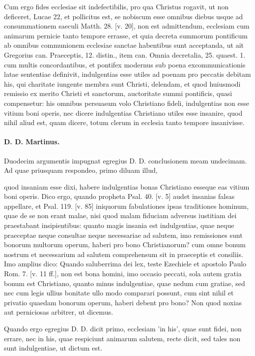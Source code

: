 Cum ergo fides ecclesiae sit indefectibilis, pro qua Christus rogavit, ut non deficeret, Lucae 22, et pollicitus est, se nobiscum esse omnibus diebus usque ad consummationem saeculi Matth. 28. [v. 20], non est admittendum, ecclesiam cum animarum pernicie tanto tempore errasse, et quia decreta summorum pontificum ab omnibus communionem ecclesiae sanctae habentibus sunt acceptanda, ut ait Gregorius can. Praeceptis, 12. distin., item can. Omnia decretalia, 25. quaest. 1. cum multis concordantibus, et pontifex modernus sub poena excommunicationis latae sententiae definivit, indulgentias esse utiles ad poenam pro peccatis debitam his, qui charitate iungente membra sunt Christi, delendam, et quod huiusmodi remissio ex merito Christi et sanctorum, auctoritate summi pontificis, quasi compensetur: his omnibus persuasum volo Christiano fideli, indulgentias non esse vitium boni operis, nec dicere indulgentias Christiano utiles esse insanire, quod nihil aliud est, quam dicere, totum clerum in ecclesia tanto tempore insanivisse.

\paragraph*{D. D. Martinus.}

Duodecim argumentis impugnat egregius D. D. conclusionem meam undecimam. Ad quae priusquam respondeo, primo diluam illud,

quod insaniam esse dixi, habere indulgentias bonas Christiano esseque eas vitium boni operis. Dico ergo, quando propheta Psal. 40. [v. 5] audet insanias falsas appellare, et Psal. 119. [v. 85] iniquorum fabulationes ipsas traditiones hominum, quae de se non erant malae, nisi quod malam fiduciam adversus iustitiam dei praestabant insipientibus: quanto magis insania est indulgentias, quae neque praeceptae neque consultae neque necessariae ad salutem, imo remissiones sunt bonorum multorum operum, haberi pro bono Christianorum? cum omne bonum nostrum et necessarium ad salutem comprehensum sit in praeceptis et consiliis. Imo amplius dico: Quando saluberrima dei lex, teste Ezechiele et apostolo Paulo Rom. 7. [v. 11 ff.], non est bona homini, imo occasio peccati, sola autem gratia bonum est Christiano, quanto minus indulgentiae, quae nedum cum gratiae, sed nec cum legis ullius bonitate ullo modo comparari possunt, \marginpar{\small[347]} cum sint nihil et privatio quaedam bonorum operum, haberi debent pro bono? Non quod noxias aut perniciosas arbitrer, ut dicemus.

Quando ergo egregius D. D. dicit primo, ecclesiam 'in his', quae sunt fidei, non errare, nec in his, quae respiciunt animarum salutem, recte dicit, sed tales non sunt indulgentiae, ut dictum est.

